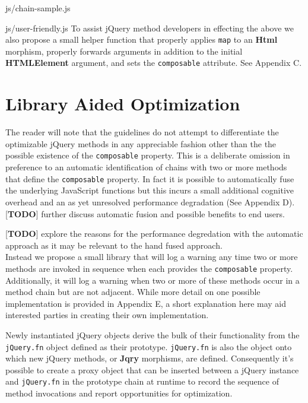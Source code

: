 \documentclass[preprint]{sigplanconf}
\begin{document}
\begin{lstinputlisting}[
    language=JavaScript,
    caption={Sources of Html objects},
    label={lst:chain-sample}
]{js/chain-sample.js}
\begin{lstinputlisting}[
    language=JavaScript,
    caption={User friendly overhead},
    label={lst:user-friendly}
]{js/user-friendly.js}
To assist jQuery method developers in effecting the above we also propose a small helper function that properly applies \verb|map| to an \textbf{Html} morphism, properly forwards arguments in addition to the initial \textbf{HTMLElement} argument, and sets the \verb|composable| attribute. See Appendix C.

\section{Library Aided Optimization} \label{sec:library-aided-optimization}

The reader will note that the guidelines do not attempt to differentiate the optimizable jQuery methods in any appreciable fashion other than the the possible existence of the \verb|composable| property. This is a deliberate omission in preference to an automatic identification of chains with two or more methods that define the \verb|composable| property. In fact it is possible to automatically fuse the underlying JavaScript functions but this incurs a small additional cognitive overhead and an as yet unresolved performance degradation (See Appendix D).
\\

[\textbf{TODO}] further discuss automatic fusion and possible benefits to end users.

[\textbf{TODO}] explore the reasons for the performance degredation with the automatic approach as it may be relevant to the hand fused approach.
\\

Instead we propose a small library that will log a warning any time two or more methods are invoked in sequence when each provides the \verb|composable| property. Additionally, it will log a warning when two or more of these methods occur in a method chain but are not adjacent. While more detail on one possible implementation is provided in Appendix E, a short explanation here may aid interested parties in creating their own implementation.

Newly instantiated jQuery objects derive the bulk of their functionality from the \verb|jQuery.fn| object defined as their prototype. \verb|jQuery.fn| is also the object onto which new jQuery methods, or \textbf{Jqry} morphisms, are defined. Consequently it's possible to create a proxy object that can be inserted between a jQuery instance and \verb|jQuery.fn| in the prototype chain at runtime to record the sequence of method invocations and report opportunities for optimization.


\end{lstinputlisting}
\end{lstinputlisting}
\end{document}
